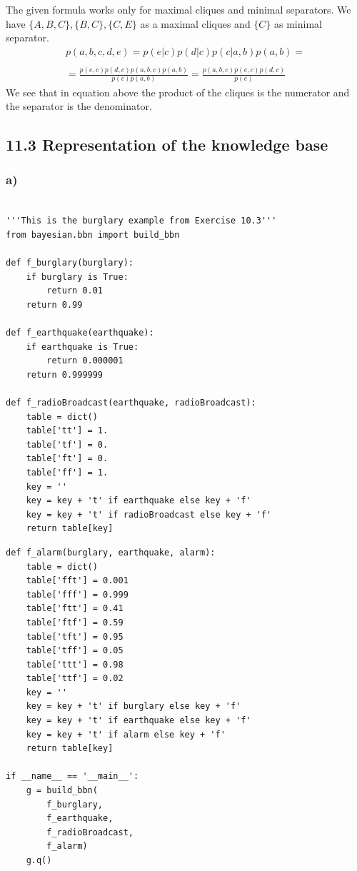 \documentclass[11pt,a4paper]{article}
\begin{document}
The given formula works only for maximal cliques and minimal separators. We have $\{A, B, C\}, \{B, C\}, \{C, E\}$ as a maximal cliques and $\{C\}$ as minimal separator.
\begin{equation}
  \begin{split}
    p(a, b, c, d, e) = p(e|c)p(d|c)p(c|a,b)p(a,b) = \\
    \\
    = \frac{p(e, c)p(d, c)p(a, b, c)p(a, b)}{p(c)p(a, b)} = \frac{p(a, b, c)p(e, c)p(d, c)}{p(c)}
  \end{split}
\end{equation}
  We see that in equation above the product of the cliques is the numerator and the separator is the denominator.

  \subsection*{11.3 Representation of the knowledge base}
\subsubsection*{a)}
\begin{verbatim}

'''This is the burglary example from Exercise 10.3'''
from bayesian.bbn import build_bbn

def f_burglary(burglary):
    if burglary is True:
        return 0.01
    return 0.99

def f_earthquake(earthquake):
    if earthquake is True:
        return 0.000001
    return 0.999999

def f_radioBroadcast(earthquake, radioBroadcast):
    table = dict()
    table['tt'] = 1.
    table['tf'] = 0.
    table['ft'] = 0.
    table['ff'] = 1.
    key = ''
    key = key + 't' if earthquake else key + 'f'
    key = key + 't' if radioBroadcast else key + 'f'
    return table[key]
\end{verbatim}
\newpage
\begin{verbatim}
def f_alarm(burglary, earthquake, alarm):
    table = dict()
    table['fft'] = 0.001
    table['fff'] = 0.999
    table['ftt'] = 0.41
    table['ftf'] = 0.59
    table['tft'] = 0.95
    table['tff'] = 0.05
    table['ttt'] = 0.98
    table['ttf'] = 0.02
    key = ''
    key = key + 't' if burglary else key + 'f'
    key = key + 't' if earthquake else key + 'f'
    key = key + 't' if alarm else key + 'f'
    return table[key]

if __name__ == '__main__':
    g = build_bbn(
        f_burglary,
        f_earthquake,
        f_radioBroadcast,
        f_alarm)
    g.q()
\end{verbatim}
\end{document}
